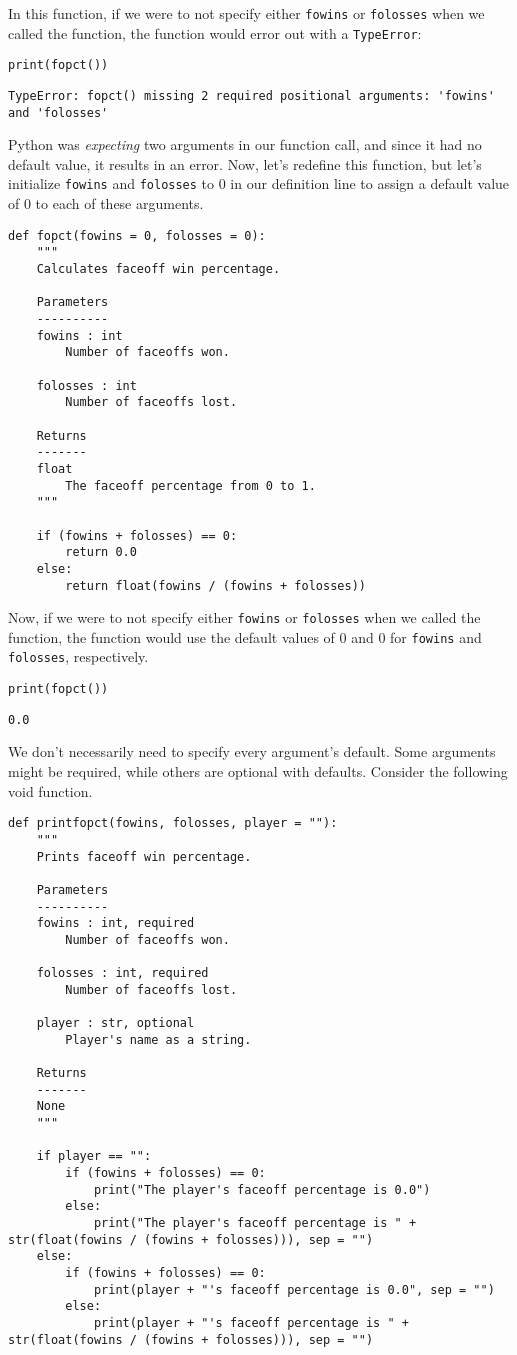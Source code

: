 In this function, if we were to not specify either \verb|fowins| or \verb|folosses| when we called the function, the function would error out with a \verb|TypeError|:
\begin{lstlisting}[style=pippython]
print(fopct())
\end{lstlisting}
\begin{lstlisting}[style=none]
TypeError: fopct() missing 2 required positional arguments: 'fowins' and 'folosses'
\end{lstlisting}
Python was \textit{expecting} two arguments in our function call, and since it had no default value, it results in an error. Now, let's redefine this function, but let's initialize \verb|fowins| and \verb|folosses| to 0 in our definition line to assign a default value of 0 to each of these arguments.\par
\begin{lstlisting}[style=pippython]
def fopct(fowins = 0, folosses = 0):
	"""
	Calculates faceoff win percentage.
	
	Parameters
	----------
	fowins : int
		Number of faceoffs won.

	folosses : int
		Number of faceoffs lost.

	Returns
	-------
	float
		The faceoff percentage from 0 to 1.
	"""
	
	if (fowins + folosses) == 0:
		return 0.0
	else:
		return float(fowins / (fowins + folosses))
\end{lstlisting}
Now, if we were to not specify either \verb|fowins| or \verb|folosses| when we called the function, the function would use the default values of 0 and 0 for \verb|fowins| and \verb|folosses|, respectively.
\begin{lstlisting}[style=pippython]
print(fopct())
\end{lstlisting}
\begin{lstlisting}[style=none]
0.0
\end{lstlisting}
We don't necessarily need to specify every argument's default. Some arguments might be required, while others are optional with defaults. Consider the following void function.\par
\begin{lstlisting}[style=pippython]
def printfopct(fowins, folosses, player = ""):
	"""
	Prints faceoff win percentage.
	
	Parameters
	----------
	fowins : int, required
		Number of faceoffs won.

	folosses : int, required
		Number of faceoffs lost.

	player : str, optional
		Player's name as a string.

	Returns
	-------
	None
	"""
	
	if player == "":
		if (fowins + folosses) == 0:
			print("The player's faceoff percentage is 0.0")
		else:
			print("The player's faceoff percentage is " + str(float(fowins / (fowins + folosses))), sep = "")
	else:
		if (fowins + folosses) == 0:
			print(player + "'s faceoff percentage is 0.0", sep = "")
		else:
			print(player + "'s faceoff percentage is " + str(float(fowins / (fowins + folosses))), sep = "")
\end{lstlisting}
